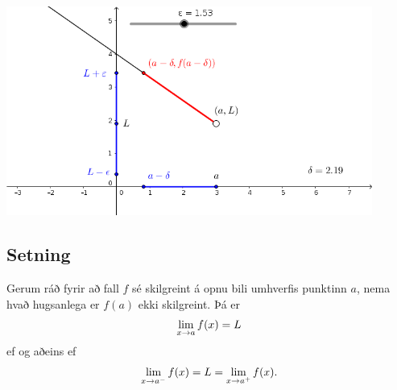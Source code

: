 \documentclass[b5paper,10pt,icelandic]{sphinxmanual}
\begin{document}
\begin{center}
\includegraphics[width=12cm,keepaspectratio=true]{03_markfravinstri.png}
\end{center}



\subsection{Setning}
\label{kafli02:setning}\label{kafli02:setning-hv-markgildi}
Gerum ráð fyrir að fall \(f\) sé skilgreint á opnu bili umhverfis
punktinn \(a\), nema hvað hugsanlega er \(f(a)\) ekki
skilgreint. Þá er
\begin{gather}
\begin{split}\lim_{x\rightarrow a} f(x)=L\end{split}\notag
\end{gather}
ef og aðeins ef
\begin{gather}
\begin{split}\lim_{x\rightarrow a^-} f(x)=L=\lim_{x\rightarrow a^+} f(x).\end{split}\notag
\end{gather}
\end{document}
